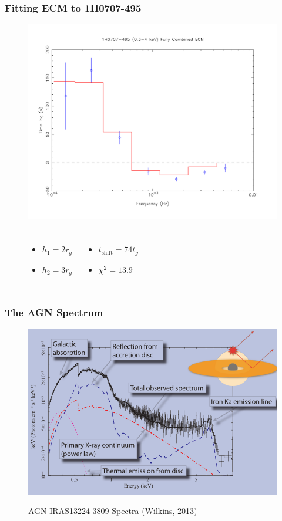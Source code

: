 \documentclass[]{beamer}
\begin{document}
\begin{frame}
\frametitle{Fitting ECM to 1H0707-495}
\begin{figure}\centering
\colorbox{white}{\includegraphics[scale=.25]{1H0707-495_fullycombECM.pdf}}\\
\begin{columns}
\begin{itemize}
    \item $h_1 = 2 r_g$
    \item $h_2 = 3 r_g$
\end{itemize}
\begin{itemize}
    \item $t_\text{shift} = 74 t_g$
    \item $\chi^2 =  13.9$
\end{itemize}
\end{columns}
\end{figure}
\end{frame}



\begin{frame}
\frametitle{The AGN Spectrum} \centering 
{
\begin{figure}
\includegraphics[scale=0.5]{AGN_spectra.png}\\
\caption{AGN IRAS13224-3809 Spectra (Wilkins, 2013)}
\end{figure}
}
\end{frame}
\end{document}
